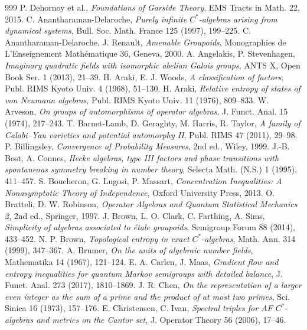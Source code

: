 \begin{thebibliography}{999}
 P. Dehornoy et al., \emph{Foundations of Garside Theory}, EMS Tracts in Math. 22, 2015.
 C. Anantharaman-Delaroche, \emph{Purely infinite $C^*$-algebras arising from dynamical systems}, Bull. Soc. Math. France 125 (1997), 199--225.
 C. Anantharaman-Delaroche, J. Renault, \emph{Amenable Groupoids}, Monographies de L'Enseignement Math\'ematique 36, Geneva, 2000.
 A. Angelakis, P. Stevenhagen, \emph{Imaginary quadratic fields with isomorphic abelian Galois groups}, ANTS X, Open Book Ser. 1 (2013), 21--39.
 H. Araki, E. J. Woods, \emph{A classification of factors}, Publ. RIMS Kyoto Univ. 4 (1968), 51--130.
 H. Araki, \emph{Relative entropy of states of von Neumann algebras}, Publ. RIMS Kyoto Univ. 11 (1976), 809--833.
 W. Arveson, \emph{On groups of automorphisms of operator algebras}, J. Funct. Anal. 15 (1974), 217--243.
 T. Barnet-Lamb, D. Geraghty, M. Harris, R. Taylor, \emph{A family of Calabi--Yau varieties and potential automorphy II}, Publ. RIMS 47 (2011), 29--98.
 P. Billingsley, \emph{Convergence of Probability Measures}, 2nd ed., Wiley, 1999.
 J.-B. Bost, A. Connes, \emph{Hecke algebras, type III factors and phase transitions with spontaneous symmetry breaking in number theory}, Selecta Math. (N.S.) 1 (1995), 411--457.
 S. Boucheron, G. Lugosi, P. Massart, \emph{Concentration Inequalities: A Nonasymptotic Theory of Independence}, Oxford University Press, 2013.
 O. Bratteli, D. W. Robinson, \emph{Operator Algebras and Quantum Statistical Mechanics 2}, 2nd ed., Springer, 1997.
 J. Brown, L. O. Clark, C. Farthing, A. Sims, \emph{Simplicity of algebras associated to \'etale groupoids}, Semigroup Forum 88 (2014), 433--452.
 N. P. Brown, \emph{Topological entropy in exact $C^*$-algebras}, Math. Ann. 314 (1999), 347--367.
 A. Brumer, \emph{On the units of algebraic number fields}, Mathematika 14 (1967), 121--124.
 E. A. Carlen, J. Maas, \emph{Gradient flow and entropy inequalities for quantum Markov semigroups with detailed balance}, J. Funct. Anal. 273 (2017), 1810--1869.
 J. R. Chen, \emph{On the representation of a larger even integer as the sum of a prime and the product of at most two primes}, Sci. Sinica 16 (1973), 157--176.
 E. Christensen, C. Ivan, \emph{Spectral triples for AF $C^*$-algebras and metrics on the Cantor set}, J. Operator Theory 56 (2006), 17--46.

\end{thebibliography}
